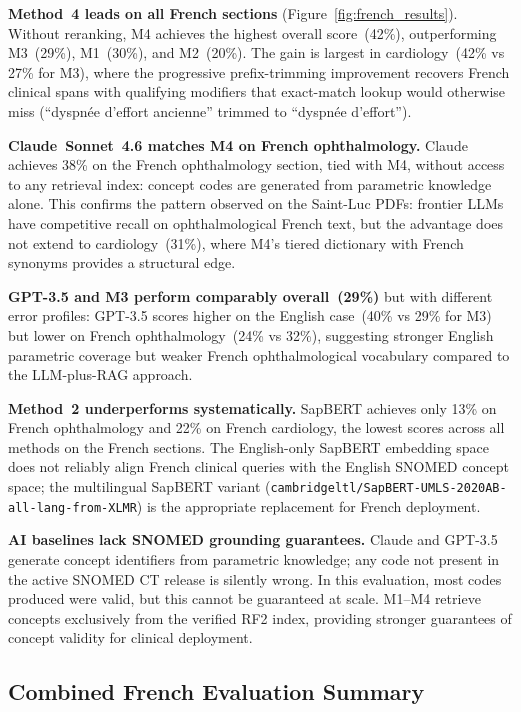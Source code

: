 \textbf{Method~4 leads on all French sections} (Figure~\ref{fig:french_results}). Without reranking, M4 achieves the highest overall score~(42\%), outperforming M3~(29\%), M1~(30\%), and M2~(20\%). The gain is largest in cardiology~(42\% vs 27\% for M3), where the progressive prefix-trimming improvement recovers French clinical spans with qualifying modifiers that exact-match lookup would otherwise miss (\eg ``dyspnée d'effort ancienne'' trimmed to ``dyspnée d'effort'').

\textbf{Claude~Sonnet~4.6 matches M4 on French ophthalmology.} Claude achieves 38\% on the French ophthalmology section, tied with M4, without access to any retrieval index: concept codes are generated from parametric knowledge alone. This confirms the pattern observed on the Saint-Luc PDFs: frontier LLMs have competitive recall on ophthalmological French text, but the advantage does not extend to cardiology~(31\%), where M4's tiered dictionary with French synonyms provides a structural edge.

\textbf{GPT-3.5 and M3 perform comparably overall~(29\%)} but with different error profiles: GPT-3.5 scores higher on the English case~(40\% vs 29\% for M3) but lower on French ophthalmology~(24\% vs 32\%), suggesting stronger English parametric coverage but weaker French ophthalmological vocabulary compared to the LLM-plus-RAG approach.

\textbf{Method~2 underperforms systematically.} SapBERT achieves only 13\% on French ophthalmology and 22\% on French cardiology, the lowest scores across all methods on the French sections. The English-only SapBERT embedding space does not reliably align French clinical queries with the English SNOMED concept space; the multilingual SapBERT variant (\texttt{cambridgeltl/SapBERT-UMLS-2020AB-all-lang-from-XLMR}) is the appropriate replacement for French deployment.

\textbf{AI baselines lack SNOMED grounding guarantees.} Claude and GPT-3.5 generate concept identifiers from parametric knowledge; any code not present in the active SNOMED CT release is silently wrong. In this evaluation, most codes produced were valid, but this cannot be guaranteed at scale. M1--M4 retrieve concepts exclusively from the verified RF2 index, providing stronger guarantees of concept validity for clinical deployment.

\subsection{Combined French Evaluation Summary}

